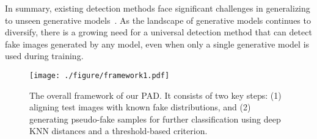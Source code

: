 In summary, existing detection methods face significant challenges in generalizing to unseen generative models~\cite{ojha2023towards}. As the landscape of generative models continues to diversify, there is a growing need for a universal detection method that can detect fake images generated by any model, even when only a single generative model is used during training. 

\begin{figure*}[t!]
  \centering
  \texttt{[image: ./figure/framework1.pdf]}
  \caption{ The overall framework of our PAD. It consists of two key steps: (1) aligning test images with known fake distributions, and (2) generating pseudo-fake samples for further classification using deep KNN distances and a threshold-based criterion.}
\label{fig: framework}
\end{figure*}
